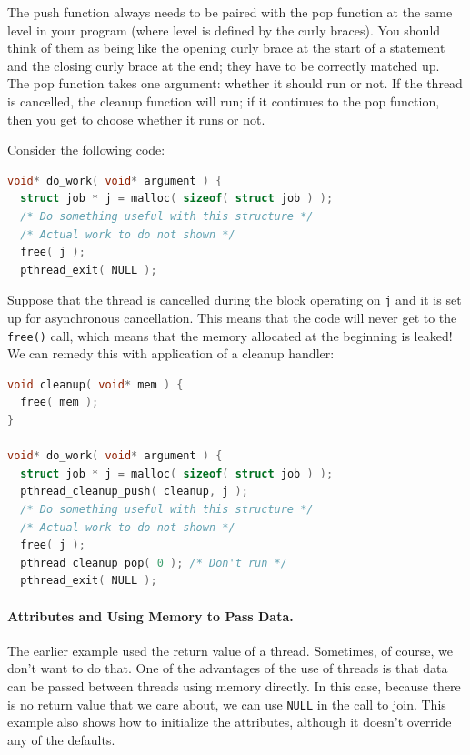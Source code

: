 The push function always needs to be paired with the pop function at the same level in your program (where level is defined by the curly braces). You should think of them as being like the opening curly brace at the start of a statement and the closing curly brace at the end; they have to be correctly matched up. The pop function takes one argument: whether it should run or not. If the thread is cancelled, the cleanup function will run; if it continues to the pop function, then you get to choose whether it runs or not.

Consider the following code: 
\begin{lstlisting}[language=C]
void* do_work( void* argument ) {
  struct job * j = malloc( sizeof( struct job ) );
  /* Do something useful with this structure */
  /* Actual work to do not shown */
  free( j );
  pthread_exit( NULL );
\end{lstlisting}

Suppose that the thread is cancelled during the block operating on \texttt{j} and it is set up for asynchronous cancellation. This means that the code will never get to the \texttt{free()} call, which means that the memory allocated at the beginning is leaked! We can remedy this with application of a cleanup handler:
\begin{lstlisting}[language=C]
void cleanup( void* mem ) {
  free( mem );
}

void* do_work( void* argument ) {
  struct job * j = malloc( sizeof( struct job ) );
  pthread_cleanup_push( cleanup, j );
  /* Do something useful with this structure */
  /* Actual work to do not shown */
  free( j );
  pthread_cleanup_pop( 0 ); /* Don't run */
  pthread_exit( NULL );
\end{lstlisting}

\paragraph{Attributes and Using Memory to Pass Data.}
The earlier example used the return value of a thread. Sometimes, of course, we don't want to do that. One of the advantages of the use of threads is that data can be passed between threads using memory directly. In this case, because there is no return value that we care about, we can use \texttt{NULL} in the call to join. This example also shows how to initialize the attributes, although it doesn't override any of the defaults.


